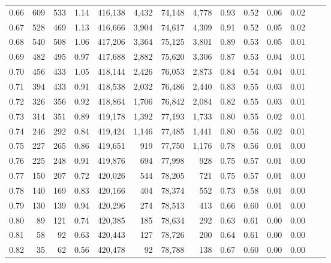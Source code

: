 \begin{tabular}{rrrrrrrrrrrrrr}
0.66 &     609 &    533 &    1.14 &  416,138 &    4,432 &  74,148 &   4,778 &  0.93 &  0.52 &  0.06 &      0.02 \\
0.67 &     528 &    469 &    1.13 &  416,666 &    3,904 &  74,617 &   4,309 &  0.91 &  0.52 &  0.05 &      0.02 \\
0.68 &     540 &    508 &    1.06 &  417,206 &    3,364 &  75,125 &   3,801 &  0.89 &  0.53 &  0.05 &      0.01 \\
0.69 &     482 &    495 &    0.97 &  417,688 &    2,882 &  75,620 &   3,306 &  0.87 &  0.53 &  0.04 &      0.01 \\
0.70 &     456 &    433 &    1.05 &  418,144 &    2,426 &  76,053 &   2,873 &  0.84 &  0.54 &  0.04 &      0.01 \\
0.71 &     394 &    433 &    0.91 &  418,538 &    2,032 &  76,486 &   2,440 &  0.83 &  0.55 &  0.03 &      0.01 \\
0.72 &     326 &    356 &    0.92 &  418,864 &    1,706 &  76,842 &   2,084 &  0.82 &  0.55 &  0.03 &      0.01 \\
0.73 &     314 &    351 &    0.89 &  419,178 &    1,392 &  77,193 &   1,733 &  0.80 &  0.55 &  0.02 &      0.01 \\
0.74 &     246 &    292 &    0.84 &  419,424 &    1,146 &  77,485 &   1,441 &  0.80 &  0.56 &  0.02 &      0.01 \\
0.75 &     227 &    265 &    0.86 &  419,651 &      919 &  77,750 &   1,176 &  0.78 &  0.56 &  0.01 &      0.00 \\
0.76 &     225 &    248 &    0.91 &  419,876 &      694 &  77,998 &     928 &  0.75 &  0.57 &  0.01 &      0.00 \\
0.77 &     150 &    207 &    0.72 &  420,026 &      544 &  78,205 &     721 &  0.75 &  0.57 &  0.01 &      0.00 \\
0.78 &     140 &    169 &    0.83 &  420,166 &      404 &  78,374 &     552 &  0.73 &  0.58 &  0.01 &      0.00 \\
0.79 &     130 &    139 &    0.94 &  420,296 &      274 &  78,513 &     413 &  0.66 &  0.60 &  0.01 &      0.00 \\
0.80 &      89 &    121 &    0.74 &  420,385 &      185 &  78,634 &     292 &  0.63 &  0.61 &  0.00 &      0.00 \\
0.81 &      58 &     92 &    0.63 &  420,443 &      127 &  78,726 &     200 &  0.64 &  0.61 &  0.00 &      0.00 \\
0.82 &      35 &     62 &    0.56 &  420,478 &       92 &  78,788 &     138 &  0.67 &  0.60 &  0.00 &      0.00 \\

\end{tabular}
